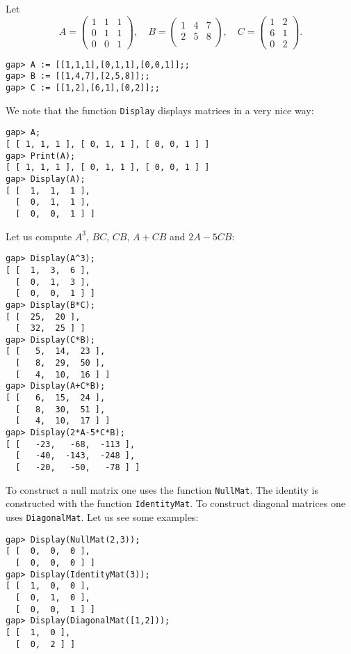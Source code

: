 \begin{example}
Let 
\[
A=\begin{pmatrix}
    1 & 1 & 1\\
    0 & 1 & 1\\
    0 & 0 & 1
\end{pmatrix},
\quad
B=\begin{pmatrix}
    1 & 4 & 7\\
    2 & 5 & 8\\
\end{pmatrix},
\quad
C=\begin{pmatrix}
    1 & 2\\
    6 & 1\\
    0 & 2
\end{pmatrix}.
\]
\begin{lstlisting}
gap> A := [[1,1,1],[0,1,1],[0,0,1]];;
gap> B := [[1,4,7],[2,5,8]];;
gap> C := [[1,2],[6,1],[0,2]];;
\end{lstlisting}
We note that the function \lstinline{Display} displays 
matrices in a very nice way:
\begin{lstlisting}
gap> A;
[ [ 1, 1, 1 ], [ 0, 1, 1 ], [ 0, 0, 1 ] ]
gap> Print(A);
[ [ 1, 1, 1 ], [ 0, 1, 1 ], [ 0, 0, 1 ] ]
gap> Display(A);
[ [  1,  1,  1 ],
  [  0,  1,  1 ],
  [  0,  0,  1 ] ]
\end{lstlisting}
Let us compute $A^3$, $BC$, $CB$, $A+CB$ and $2A-5CB$: 
\begin{lstlisting}
gap> Display(A^3);
[ [  1,  3,  6 ],
  [  0,  1,  3 ],
  [  0,  0,  1 ] ]
gap> Display(B*C);
[ [  25,  20 ],
  [  32,  25 ] ]
gap> Display(C*B);
[ [   5,  14,  23 ],
  [   8,  29,  50 ],
  [   4,  10,  16 ] ]
gap> Display(A+C*B);
[ [   6,  15,  24 ],
  [   8,  30,  51 ],
  [   4,  10,  17 ] ]
gap> Display(2*A-5*C*B);
[ [   -23,   -68,  -113 ],
  [   -40,  -143,  -248 ],
  [   -20,   -50,   -78 ] ]
\end{lstlisting}
\end{example}

To construct a null matrix one uses the function \lstinline{NullMat}. The
identity is constructed with the function \lstinline{IdentityMat}. To construct
diagonal matrices one uses \lstinline{DiagonalMat}. Let us see some
examples:
\begin{lstlisting}
gap> Display(NullMat(2,3));
[ [  0,  0,  0 ],
  [  0,  0,  0 ] ]
gap> Display(IdentityMat(3));
[ [  1,  0,  0 ],
  [  0,  1,  0 ],
  [  0,  0,  1 ] ]
gap> Display(DiagonalMat([1,2]));
[ [  1,  0 ],
  [  0,  2 ] ]
\end{lstlisting}

